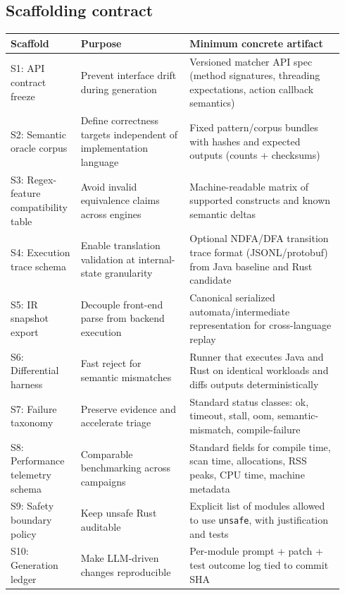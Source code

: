 \documentclass[11pt]{article}
\begin{document}
\subsection{Scaffolding contract}
\begin{longtable}{p{0.19\linewidth}p{0.31\linewidth}p{0.44\linewidth}}
\toprule
\textbf{Scaffold} & \textbf{Purpose} & \textbf{Minimum concrete artifact} \\
\midrule
\endhead
S1: API contract freeze & Prevent interface drift during generation & Versioned matcher API spec (method signatures, threading expectations, action callback semantics) \\
S2: Semantic oracle corpus & Define correctness targets independent of implementation language & Fixed pattern/corpus bundles with hashes and expected outputs (counts + checksums) \\
S3: Regex-feature compatibility table & Avoid invalid equivalence claims across engines & Machine-readable matrix of supported constructs and known semantic deltas \\
S4: Execution trace schema & Enable translation validation at internal-state granularity & Optional NDFA/DFA transition trace format (JSONL/protobuf) from Java baseline and Rust candidate \\
S5: IR snapshot export & Decouple front-end parse from backend execution & Canonical serialized automata/intermediate representation for cross-language replay \\
S6: Differential harness & Fast reject for semantic mismatches & Runner that executes Java and Rust on identical workloads and diffs outputs deterministically \\
S7: Failure taxonomy & Preserve evidence and accelerate triage & Standard status classes: ok, timeout, stall, oom, semantic-mismatch, compile-failure \\
S8: Performance telemetry schema & Comparable benchmarking across campaigns & Standard fields for compile time, scan time, allocations, RSS peaks, CPU time, machine metadata \\
S9: Safety boundary policy & Keep unsafe Rust auditable & Explicit list of modules allowed to use \texttt{unsafe}, with justification and tests \\
S10: Generation ledger & Make LLM-driven changes reproducible & Per-module prompt + patch + test outcome log tied to commit SHA \\
\bottomrule
\end{longtable}
\end{document}

